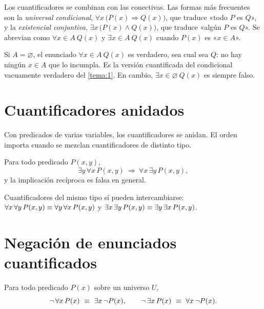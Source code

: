 Los cuantificadores se combinan con las conectivas. Las formas más frecuentes son la \emph{universal condicional}, $\forall x\,\bigl(P(x)\Rightarrow Q(x)\bigr)$, que traduce «todo $P$ es $Q$», y la \emph{existencial conjuntiva}, $\exists x\,\bigl(P(x)\wedge Q(x)\bigr)$, que traduce «algún $P$ es $Q$». Se abrevian como $\forall x\in A\ Q(x)$ y $\exists x\in A\ Q(x)$ cuando $P(x)$ es «$x\in A$».

\addtocounter{definicion}{1}%

\begin{observacion}
Si $A=\varnothing$, el enunciado $\forall x\in A\ Q(x)$ es verdadero, sea cual sea $Q$: no hay ningún $x\in A$ que lo incumpla. Es la versión cuantificada del condicional vacuamente verdadero del \cref{tema:1}. En cambio, $\exists x\in\varnothing\ Q(x)$ es siempre falso.
\end{observacion}

\section{Cuantificadores anidados}

Con predicados de varias variables, los cuantificadores se anidan. El orden importa cuando se mezclan cuantificadores de distinto tipo.

\addtocounter{definicion}{1}%

\begin{proposicion}\label{prop:orden}
Para todo predicado $P(x,y)$,
\[
\exists y\,\forall x\,P(x,y)\ \Longrightarrow\ \forall x\,\exists y\,P(x,y),
\]
y la implicación recíproca es falsa en general.
\end{proposicion}

Cuantificadores del mismo tipo sí pueden intercambiarse: $\forall x\,\forall y\,P(x,y)\equiv\forall y\,\forall x\,P(x,y)$ y $\exists x\,\exists y\,P(x,y)\equiv\exists y\,\exists x\,P(x,y)$.

\addtocounter{definicion}{1}%

\section{Negación de enunciados cuantificados}

\begin{teorema}\label{teo:negacion}
Para todo predicado $P(x)$ sobre un universo $U$,
\[
\neg\,\forall x\,P(x)\ \equiv\ \exists x\,\neg P(x),\qquad
\neg\,\exists x\,P(x)\ \equiv\ \forall x\,\neg P(x).
\]
\end{teorema}

